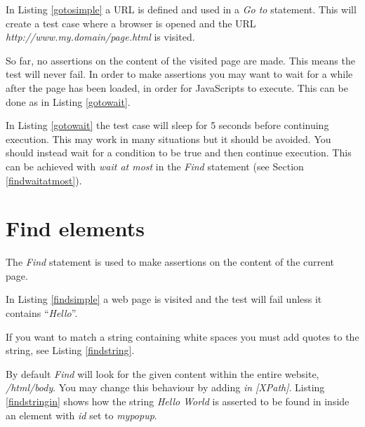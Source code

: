 \documentclass[a4paper,11pt]{kth-mag}
\begin{document}
In Listing \ref{gotosimple} a URL is defined and used in a \textit{Go to} statement. This will create a test case where a browser is opened and the URL \textit{http://www.my.domain/page.html} is visited.


So far, no assertions on the content of the visited page are made. This means the test will never fail. In order to make assertions you may want to wait for a while after the page has been loaded, in order for JavaScripts to execute. This can be done as in Listing \ref{gotowait}.

\lstset{basicstyle=\footnotesize, caption=Go to statement with wait, label=gotowait, numbers=left, frame=single, captionpos=b}


In Listing \ref{gotowait} the test case will sleep for 5 seconds before continuing execution. This may work in many situations but it should be avoided. You should instead wait for a condition to be true and then continue execution. This can be achieved with \textit{wait at most} in the \textit{Find} statement (see Section \ref{findwaitatmost}).


\section{Find elements}
The \textit{Find} statement is used to make assertions on the content of the current page.

\lstset{basicstyle=\footnotesize, caption=Find statement, label=findsimple, numbers=left, frame=single, captionpos=b}


In Listing \ref{findsimple} a web page is visited and the test will fail unless it contains ``\textit{Hello}''.

If you want to match a string containing white spaces you must add quotes to the string, see Listing \ref{findstring}.

\lstset{basicstyle=\footnotesize, caption=Find statement with spaces, label=findstring, numbers=left, frame=single, captionpos=b}


By default \textit{Find} will look for the given content within the entire website, \textit{/html/body}. You may change this behaviour by adding \textit{in [XPath]}. Listing \ref{findstringin} shows how the string \textit{Hello World} is asserted to be found in inside an element with \textit{id} set to \textit{mypopup}. 
\end{document}

